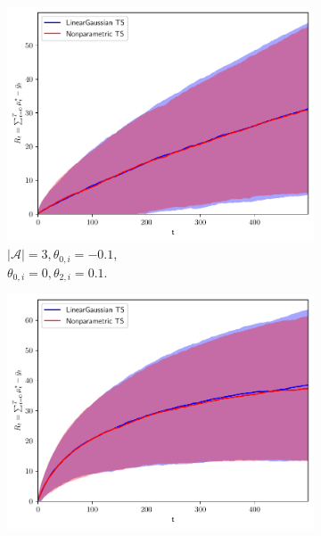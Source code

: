 \begin{figure}[!h]
	\begin{subfigure}[b]{0.32\textwidth}
		\includegraphics[width=\textwidth]{./figs/linearGaussian/cumregret_A3_-01_-01_0_0_01_01_1_1_1}
		\vspace*{-5ex}
		\caption{$|\mathcal{A}|=3, \theta_{0,i}=-0.1$, \\ \hspace*{0.3cm}$\theta_{0,i}=0, \theta_{2,i}=0.1$.}
		\label{fig:linear_gaussian_A3_01}
	\end{subfigure}
	\begin{subfigure}[b]{0.32\textwidth}
		\includegraphics[width=\textwidth]{./figs/linearGaussian/cumregret_A3_-05_-05_0_0_05_05_1_1_1}
		\vspace*{-5ex}

\end{subfigure}
\end{figure}
